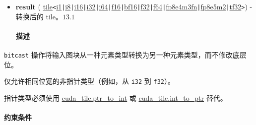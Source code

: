 \documentclass{article}
\begin{document}
\begin{itemize}
\item \textbf{result} ( \href{https://docs.nvidia.com/cuda/tile-ir/latest/sections/types.html#type-tile}{tile}\texttt{<}\href{https://docs.nvidia.com/cuda/tile-ir/latest/sections/types.html#subsection-element-types}{i1}\texttt{|}\href{https://docs.nvidia.com/cuda/tile-ir/latest/sections/types.html#subsection-element-types}{i8}\texttt{|}\href{https://docs.nvidia.com/cuda/tile-ir/latest/sections/types.html#subsection-element-types}{i16}\texttt{|}\href{https://docs.nvidia.com/cuda/tile-ir/latest/sections/types.html#subsection-element-types}{i32}\texttt{|}\href{https://docs.nvidia.com/cuda/tile-ir/latest/sections/types.html#subsection-element-types}{i64}\texttt{|}\href{https://docs.nvidia.com/cuda/tile-ir/latest/sections/types.html#subsection-element-types}{f16}\texttt{|}\href{https://docs.nvidia.com/cuda/tile-ir/latest/sections/types.html#subsection-element-types}{bf16}\texttt{|}\href{https://docs.nvidia.com/cuda/tile-ir/latest/sections/types.html#subsection-element-types}{f32}\texttt{|}\href{https://docs.nvidia.com/cuda/tile-ir/latest/sections/types.html#subsection-element-types}{f64}\texttt{|}\href{https://docs.nvidia.com/cuda/tile-ir/latest/sections/types.html#subsection-element-types}{fp8e4m3fn}\texttt{|}\href{https://docs.nvidia.com/cuda/tile-ir/latest/sections/types.html#subsection-element-types}{fp8e5m2}\texttt{|}\href{https://docs.nvidia.com/cuda/tile-ir/latest/sections/types.html#subsection-element-types}{tf32}\texttt{>}) - 转换后的 tile。$\boxed{13.1}$


\paragraph{描述}

\end{itemize}
\texttt{bitcast} 操作将输入图块从一种元素类型转换为另一种元素类型，而不修改底层位。


仅允许相同位宽的非指针类型（例如，从 \texttt{i32} 到 \texttt{f32}）。

指针类型必须使用 \href{https://docs.nvidia.com/cuda/tile-ir/latest/sections/operations.html#op-cuda-tile-ptr-to-int}{cuda\_tile.ptr\_to\_int} 或 \href{https://docs.nvidia.com/cuda/tile-ir/latest/sections/operations.html#op-cuda-tile-int-to-ptr}{cuda\_tile.int\_to\_ptr} 替代。



\paragraph{约束条件}
\end{document}

